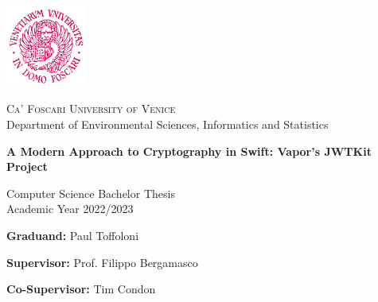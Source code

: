 \begin{titlepage}
    \begin{center}
        \begin{center}
            \includegraphics[width=0.2\textwidth]{img/logo.png}
        \end{center}
        \begin{Large}
            \textsc{Ca' Foscari University of Venice\\}
            Department of Environmental Sciences, Informatics and Statistics\\
        \end{Large}

        \vspace{3cm}

        \Huge
        \textbf{A Modern Approach to Cryptography in Swift: Vapor's JWTKit Project}

        \vspace{2.5cm} \Large Computer Science Bachelor Thesis \\
        \Large Academic Year 2022/2023

        \vspace{2.5cm}
    \end{center}

    \Large
    \textbf{Graduand:} Paul Toffoloni

    \textbf{Supervisor:} Prof. Filippo Bergamasco

    \textbf{Co-Supervisor:} Tim Condon
\end{titlepage}
